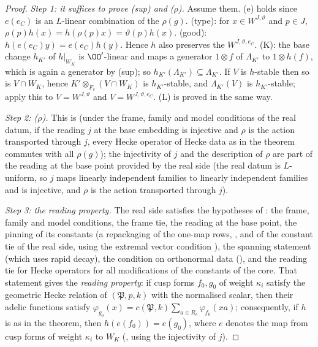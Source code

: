 \begin{proof}
\emph{Step 1: it suffices to prove (sup) and ($\rho$).} Assume them. (e) holds since $e(e_C)$ is an $L$-linear
combination of the $\rho(g)$. (type): for $x\in W^{J,\vartheta}$ and $p\in J$, $\rho(p)h(x)=h(\rho(p)x)=\vartheta(p)h(x)$. (good):
$h(e(e_C)y)=e(e_C)h(y)$. Hence $h$ also preserves the $W^{J,\vartheta,e_C}$. (K): the base change $h_{K'}$ of $h|_{W_K}$ is
$\OO'$-linear and maps a generator $1\otimes f$ of $\Lambda_{K'}$ to $1\otimes h(f)$, which is again a generator by (sup); so
$h_{K'}(\Lambda_{K'})\subseteq\Lambda_{K'}$. If $V$ is $h$-stable then so is $V\cap W_K$, hence $K'\otimes_{F_c}(V\cap W_K)$ is $h_{K'}$-stable,
and $\Lambda_{K'}(V)$ is $h_{K'}$-stable; apply this to $V=W^{J,\vartheta}$ and $V=W^{J,\vartheta,e_C}$. (L) is proved in the same way.

\emph{Step 2: ($\rho$).} This is  (under the frame, family and model
conditions of the real datum, if the reading $j$ at the base embedding is injective and $\rho$ is the action
transported through $j$, every Hecke operator of Hecke data as in the theorem commutes with all $\rho(g)$);
the injectivity of $j$ and the description of $\rho$ are part of the reading at the base point provided by the
real side (the real datum is $L$-uniform, so $j$ maps linearly independent families to linearly independent
families and is injective, and $\rho$ is the action transported through $j$).

\emph{Step 3: the reading property.} The real side satisfies the hypotheses of
: the frame, family and model conditions, the frame tie,
the reading at the base point, the pinning of its constants (a repackaging of the one-map rows,
, and of the constant tie of the real side, using
the extremal vector condition ), the spanning statement
 (which uses rapid decay), the condition on orthonormal data
(), and the reading tie for Hecke operators for all modifications
of the constants of the core. That statement gives the \emph{reading property}: if cusp forms $f_0,g_0$ of weight
$\kappa_i$ satisfy the geometric Hecke relation of $(\mathfrak P,p,k)$ with the normalised scalar, then their adelic
functions satisfy $\varphi_{g_0}(x)=c(\mathfrak P,k)\sum_{a\in R_c}\varphi_{f_0}(xa)$; consequently, if $h$ is as in the theorem,
then $h(e(f_0))=e(g_0)$, where $e$ denotes the map from cusp forms of weight $\kappa_i$ to $W_K$
(, using the injectivity of $j$).


\end{proof}
